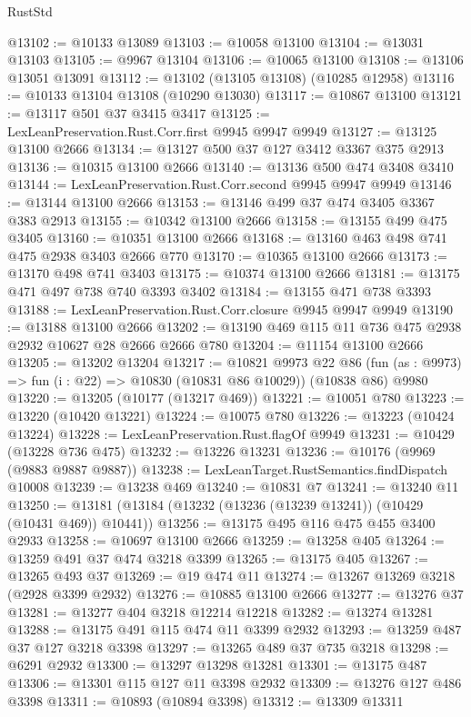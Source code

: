 \begin{lexlean}{RustStd}
\begin{coremodule}
{\begin{coremodule}
{{{{{{{{{{{{{{{{{{{{{{{{{{{{{{{{{{{{{{{{{{{{{{{{{{{{{{{{{{{{{{{{{{{{{{{{{{{{{{@13102 := @10133 @13089
@13103 := @10058 @13100
@13104 := @13031 @13103
@13105 := @9967 @13104
@13106 := @10065 @13100
@13108 := @13106 @13051 @13091
@13112 := @13102 (@13105 @13108) (@10285 @12958)
@13116 := @10133 @13104 @13108 (@10290 @13030)
@13117 := @10867 @13100
@13121 := @13117 @501 @37 @3415 @3417
@13125 := LexLeanPreservation.Rust.Corr.first @9945 @9947 @9949
@13127 := @13125 @13100 @2666
@13134 := @13127 @500 @37 @127 @3412 @3367 @375 @2913
@13136 := @10315 @13100 @2666
@13140 := @13136 @500 @474 @3408 @3410
@13144 := LexLeanPreservation.Rust.Corr.second @9945 @9947 @9949
@13146 := @13144 @13100 @2666
@13153 := @13146 @499 @37 @474 @3405 @3367 @383 @2913
@13155 := @10342 @13100 @2666
@13158 := @13155 @499 @475 @3405
@13160 := @10351 @13100 @2666
@13168 := @13160 @463 @498 @741 @475 @2938 @3403 @2666 @770
@13170 := @10365 @13100 @2666
@13173 := @13170 @498 @741 @3403
@13175 := @10374 @13100 @2666
@13181 := @13175 @471 @497 @738 @740 @3393 @3402
@13184 := @13155 @471 @738 @3393
@13188 := LexLeanPreservation.Rust.Corr.closure @9945 @9947 @9949
@13190 := @13188 @13100 @2666
@13202 := @13190 @469 @115 @11 @736 @475 @2938 @2932 @10627 @28 @2666 @2666 @780
@13204 := @11154 @13100 @2666
@13205 := @13202 @13204
@13217 := @10821
    @9973
    @22
    @86
    (fun (as : @9973) => fun (i : @22) => @10830 (@10831 @86 @10029))
    (@10838 @86)
    @9980
@13220 := @13205 (@10177 (@13217 @469))
@13221 := @10051 @780
@13223 := @13220 (@10420 @13221)
@13224 := @10075 @780
@13226 := @13223 (@10424 @13224)
@13228 := LexLeanPreservation.Rust.flagOf @9949
@13231 := @10429 (@13228 @736 @475)
@13232 := @13226 @13231
@13236 := @10176 (@9969 (@9883 @9887 @9887))
@13238 := LexLeanTarget.RustSemantics.findDispatch @10008
@13239 := @13238 @469
@13240 := @10831 @7
@13241 := @13240 @11
@13250 := @13181 (@13184 (@13232 (@13236 (@13239 @13241)) (@10429 (@10431 @469)) @10441))
@13256 := @13175 @495 @116 @475 @455 @3400 @2933
@13258 := @10697 @13100 @2666
@13259 := @13258 @405
@13264 := @13259 @491 @37 @474 @3218 @3399
@13265 := @13175 @405
@13267 := @13265 @493 @37
@13269 := @19 @474 @11
@13274 := @13267 @13269 @3218 (@2928 @3399 @2932)
@13276 := @10885 @13100 @2666
@13277 := @13276 @37
@13281 := @13277 @404 @3218 @12214 @12218
@13282 := @13274 @13281
@13288 := @13175 @491 @115 @474 @11 @3399 @2932
@13293 := @13259 @487 @37 @127 @3218 @3398
@13297 := @13265 @489 @37 @735 @3218
@13298 := @6291 @2932
@13300 := @13297 @13298 @13281
@13301 := @13175 @487
@13306 := @13301 @115 @127 @11 @3398 @2932
@13309 := @13276 @127 @486 @3398
@13311 := @10893 (@10894 @3398)
@13312 := @13309 @13311
}}}}}}}}}}}}}}}}}}}}}}}}}}}}}}}}}}}}}}}}}}}}}}}}}}}}}}}}}}}}}}}}}}}}}}}}}}}}}}
\end{coremodule}}
\end{coremodule}
\end{lexlean}
